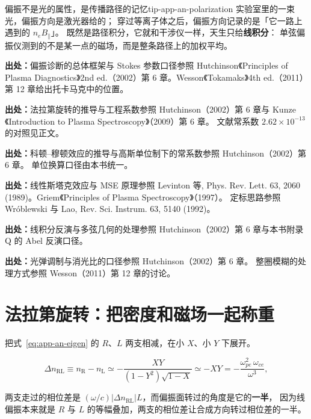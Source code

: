 \begin{tip}{偏振不是光的属性，是传播路径的记忆}{tip-app-an-polarization}
实验室里的一束光，偏振方向是激光器给的；
穿过等离子体之后，偏振方向记录的是「它一路上遇到的 $n_e B_\parallel$」。
既然是路径积分，它就和干涉仪一样，天生只给\textbf{线积分}：
单弦偏振仪测到的不是某一点的磁场，而是整条路径上的加权平均。
\end{tip}

{\footnotesize
\textbf{出处：}偏振诊断的总体框架与 Stokes 参数口径参照 Hutchinson《Principles of Plasma Diagnostics》2nd ed.（2002）第 6 章。Wesson《Tokamaks》4th ed.（2011）第 12 章给出托卡马克中的位置。
}

{\footnotesize
\textbf{出处：}法拉第旋转的推导与工程系数参照 Hutchinson（2002）第 6 章与 Kunze《Introduction to Plasma Spectroscopy》（2009）第 6 章。
文献常系数 $2.62\times10^{-13}$ 的对照见正文。
}

{\footnotesize
\textbf{出处：}科顿--穆顿效应的推导与高斯单位制下的常系数参照 Hutchinson（2002）第 6 章。
单位换算口径由本书统一。
}

{\footnotesize
\textbf{出处：}线性斯塔克效应与 MSE 原理参照 Levinton 等, Phys. Rev. Lett. 63, 2060 (1989)。Griem《Principles of Plasma Spectroscopy》（1997）。
定标思路参照 Wróblewski 与 Lao, Rev. Sci. Instrum. 63, 5140 (1992)。
}

{\footnotesize
\textbf{出处：}线积分反演与多弦几何的处理参照 Hutchinson（2002）第 6 章与本书附录 Q 的 Abel 反演口径。
}

{\footnotesize
\textbf{出处：}光弹调制与消光比的口径参照 Hutchinson（2002）第 6 章。
整圈模糊的处理方式参照 Wesson（2011）第 12 章的讨论。
}


\section{法拉第旋转：把密度和磁场一起称重}
\label{sec:app-an-faraday}

把式~\eqref{eq:app-an-eigen} 的 $R$、$L$ 两支相减，在小 $X$、小 $Y$ 下展开。

\begin{equation}
\Delta n_{\mathrm{RL}}\equiv n_{\mathrm{R}}-n_{\mathrm{L}}
\simeq-\frac{XY}{(1-Y^2)\sqrt{1-X}}
\simeq-XY=-\frac{\omega_{pe}^2\,\omega_{ce}}{\omega^3},
\label{eq:app-an-faraday}
\end{equation}

两支走过的相位差是 $(\omega/c)|\Delta n_{\mathrm{RL}}|L$，而偏振面转过的角度是它的\textbf{一半}，
因为线偏振本来就是 $R$ 与 $L$ 的等幅叠加，两支的相位差让合成方向转过相位差的一半。

